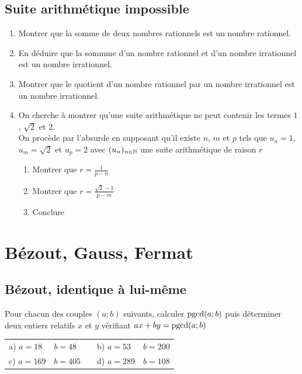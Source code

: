 \documentclass[oneside,12pt]{book}          %
\begin{document}
\subsection{Suite arithmétique impossible}
\begin{enumerate}
    \item Montrer que la somme de deux nombres rationnels est un nombre rationnel.
    \item En déduire que la sommme d'un nombre rationnel et d'un nombre irrationnel est un nombre irrationnel.
    \item Montrer que le quotient d'un nombre rationnel par un nombre irrationnel est un nombre irrationnel.
    \item On cherche à montrer qu'une suite arithmétique ne peut contenir les termes $1$, $\sqrt{2}$ et 2.\\
    On procède par l'absurde en supposant qu'il existe $n$, $m$ et $p$ tels que $u_n=1$, $u_m=\sqrt{2}$ et $u_p=2$ avec ${(u_{n})_{n\in\mathbb N}}$ une suite arithmétique de raison $r$
    \begin{enumerate}
        \item Montrer que $r=\frac{1}{p-n}$
        \item Montrer que $r=\frac{\sqrt{2}-1}{p-m}$
        \item Conclure
    \end{enumerate}
\end{enumerate}



\section{Bézout, Gauss, Fermat}

\subsection{Bézout, identique à lui-même}
Pour chacun des couples $(a;b)$ suivants, calculer ${\mathrm{pgcd}}(a;b)$ puis déterminer deux entiers relatifs $x$ et $y$ vérifiant $ax+by={\mathrm{pgcd}}(a;b)$

\begin{tabular}{p{20mm}p{35mm}|p{15mm}p{30mm}p{30mm}}
     a) $a=18$ & $b=48$ & & b) $a=53$ & $b=200$ \\
     c) $a=169$ & $b=405$ & & d) $a=289$ & $b=108$
\end{tabular}
\end{document}
